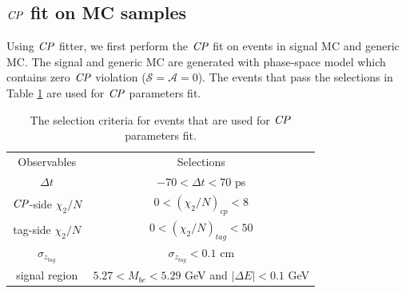 \subsection{$\it{CP}$ fit on MC samples}
Using $\it{CP}$ fitter, we first perform the $\it{CP}$ fit on events in signal MC and generic MC.
The signal and generic MC are generated with phase-space model which contains zero $\it{CP}$ violation ($\mathcal{S}=\mathcal{A}=0$). The events that pass the selections in Table \ref{tab:cutCP} are used for $\it{CP}$ parameters fit.
\begin{table}
	\centering
\begin{tabular}{c|c}
	\hline
	Observables & Selections \\
	$\Delta t$ & $-70 < \Delta t < 70$ ps\\
	$\it{CP}$-side $\chi_2/N$ & $0 < (\chi_2/N)_{cp} < 8 $ \\
	tag-side $\chi_2/N$  & $0 < (\chi_2/N)_{tag} < 50 $\\
	$\sigma_{z_{tag}}$ &  $\sigma_{z_{tag}} < 0.1$ cm\\
	signal region & $5.27 < M_{bc} < 5.29$ GeV and $|\Delta E| < 0.1$ GeV\\
	\hline

\end{tabular}
\caption{The selection criteria for events that are used for $\it{CP}$ parameters fit.}
\label{tab:cutCP}
\end{table}



